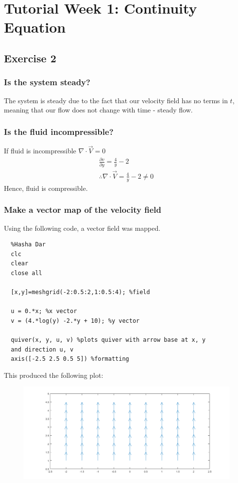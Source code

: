 \documentclass[class=report, crop=false, 12pt,a4paper]{standalone}
\begin{document}
\section{Tutorial Week 1: Continuity Equation}
\subsection{Exercise 2}
\subsubsection{Is the system steady?}
The system is steady due to the fact that our velocity field has no terms in $t$, meaning that our flow does not change with time - steady flow.
\subsubsection{Is the fluid incompressible?}
If fluid is incompressible $\nabla \cdot\vec{V} = 0$
\begin{gather}
  \frac{\partial v}{\partial y} = \frac{4}{y} -2\\
  \therefore \nabla \cdot \vec{V} = \frac{4}{y} - 2 \neq 0
\end{gather}
Hence, fluid is compressible.
\subsubsection{Make a vector map of the velocity field}
Using the following code, a vector field was mapped.
\begin{verbatim}
  %Hasha Dar
  clc
  clear
  close all
  
  [x,y]=meshgrid(-2:0.5:2,1:0.5:4); %field
  
  u = 0.*x; %x vector
  v = (4.*log(y) -2.*y + 10); %y vector
  
  quiver(x, y, u, v) %plots quiver with arrow base at x, y 
  and direction u, v
  axis([-2.5 2.5 0.5 5]) %formatting
\end{verbatim}
This produced the following plot:
\begin{figure}[H]
  \centering
  \includegraphics[width = \textwidth]{../img/quiverplotexercise20011-002.png}
\end{figure}
\end{document}

